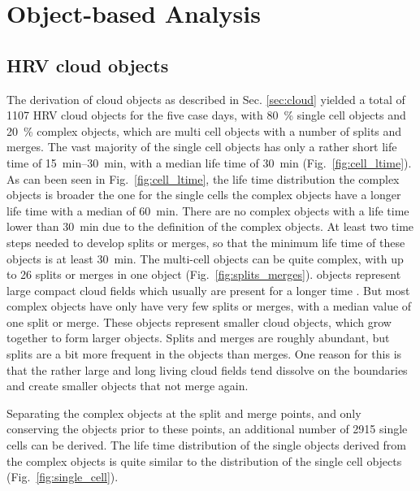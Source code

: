 \chapter{Object-based Analysis}

\section{HRV cloud objects}
The derivation of cloud objects as described in Sec. \ref{sec:cloud} yielded a total of \num{1107} HRV cloud objects for the five case days, with \SI{80}{\percent} single cell objects and \SI{20}{\percent} complex objects, which are multi cell objects with a number of splits and merges. The vast majority of the single cell objects has only a rather short life time of \SIrange{15}{30}{\minute}, with a median life time of \SI{30}{\minute} (Fig.~\ref{fig:cell_ltime}). As  can been seen in Fig.~\ref{fig:cell_ltime}, the life time distribution  the complex objects is broader  the one for the single cells  the complex objects  have a longer life time with a median of \SI{60}{\minute}. There are no complex objects with a life time  lower than \SI{30}{\minute}  due to the definition of the complex objects.  At least two time steps  needed to develop splits or merges, so that the minimum life time of these objects is at least \SI{30}{\minute}. The multi-cell objects can be quite complex, with up to \num{26} splits or merges in one object (Fig.~\ref{fig:splits_merges}).  objects represent large compact cloud fields which usually are present for a longer time . But most complex objects have only have very few splits or merges, with a median value of one split or merge. These objects  represent smaller cloud objects, which grow together to form larger objects. Splits and merges are roughly  abundant, but splits are a bit more frequent in the objects than merges. One reason for this is that the rather large and long living cloud fields tend  dissolve on the boundaries and  create smaller objects that  not merge again.

Separating the complex objects at the split and merge points, and only conserving the objects prior to these points, an additional number of \num{2915} single cells can be derived. The life time distribution of the single objects derived from the complex objects is quite similar to the distribution of the single cell objects (Fig.~\ref{fig:single_cell}).

